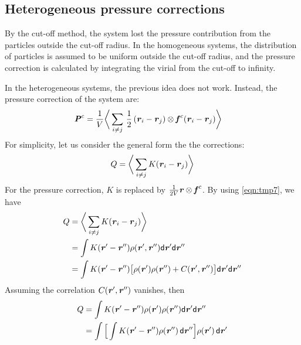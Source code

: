 \documentclass[aps,pre,preprint]{revtex4}
\renewcommand{\v}[1]{\textbf{\textit{#1}}}
\renewcommand{\d}[1]{\textsf{#1}}
\begin{document}




\subsection{Heterogeneous pressure corrections}
By the cut-off method, the system lost the pressure contribution from
the particles outside the cut-off radius.  In the homogeneous systems,
the distribution of particles is assumed to be uniform outside the
cut-off radius, and the pressure correction is calculated by
integrating the virial from the cut-off to infinity.

In the heterogeneous systems, the previous idea does not
work. Instead, the pressure correction of the system are:
\begin{align}
  \v P^c &= \frac1{V} \bigg\langle \sum_{i\neq j}\,\frac12\, (\v r_i - \v r_j) \otimes \v f^c(\v r_i - \v r_j) \bigg\rangle
\end{align}
For simplicity, let us consider the general form the the corrections:
\begin{align}
  Q = \bigg\langle \sum_{i\neq j} K(\v r_i - \v r_j) \bigg\rangle
\end{align}
For the pressure correction, $K$ is replaced by $\frac{1}{2V}\v
r\otimes\v f^c$.  By using \eqref{eqn:tmp7}, we have
\begin{align}\nonumber
  Q
  &= \bigg\langle \sum_{i\neq j} K(\v r_i - \v r_j) \bigg\rangle\\\nonumber
  & = \int K(\v r' - \v r'') \rho(\v r', \v r'') \d d\v r'\d d\v r'' \\\nonumber
  & = \int K(\v r' - \v r'')
  \big[
  \rho(\v r') \rho(\v r'') + C(\v r', \v r'')
  \big]
  \d d\v r'\d d\v r''
\end{align}
Assuming the correlation $C(\v r', \v r'')$ vanishes, then
\begin{align} \nonumber
  Q 
  & = \int K(\v r' - \v r'')
  \rho(\v r') \rho(\v r'') 
  \d d\v r'\d d\v r'' \\
  & = \int
  \Big[
  \int K(\v r' - \v r'') \rho(\v r'')\,\d d\v r''
  \Big]
  \rho(\v r')\,\d d\v r'
\end{align}
\end{document}
